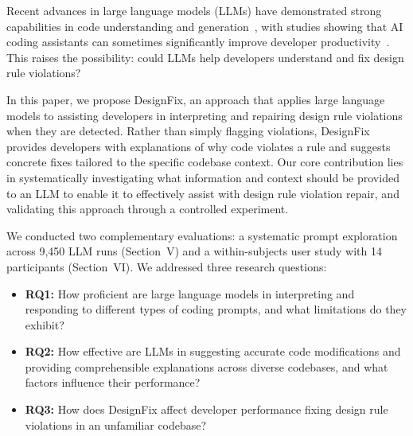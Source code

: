 \documentclass[conference]{IEEEtran}
\begin{document}
Recent advances in large language models (LLMs) have demonstrated strong capabilities in code understanding and generation~\cite{peng2023impact}, with studies showing that AI coding assistants can sometimes significantly improve developer productivity~\cite{peng2023impact, liang2024survey}. This raises the possibility: could LLMs help developers understand and fix design rule violations?


In this paper, we propose DesignFix, an approach that applies large language models to assisting developers in interpreting and repairing design rule violations when they are detected. Rather than simply flagging violations, DesignFix provides developers with explanations of why code violates a rule and suggests concrete fixes tailored to the specific codebase context. Our core contribution lies in systematically investigating what information and context should be provided to an LLM to enable it to effectively assist with design rule violation repair, and validating this approach through a controlled experiment.

We conducted two complementary evaluations: a systematic prompt exploration across 9,450 LLM runs (Section~V) and a within-subjects user study with 14 participants (Section~VI). We addressed three research questions:

\begin{itemize}
\item \textbf{RQ1:} How proficient are large language models in interpreting and responding to different types of coding prompts, and what limitations do they exhibit?
\item \textbf{RQ2:} How effective are LLMs in suggesting accurate code modifications and providing comprehensible explanations across diverse codebases, and what factors influence their performance?
\item \textbf{RQ3:} How does DesignFix affect developer  performance fixing design rule violations in an unfamiliar codebase?
\end{itemize}

\end{document}
